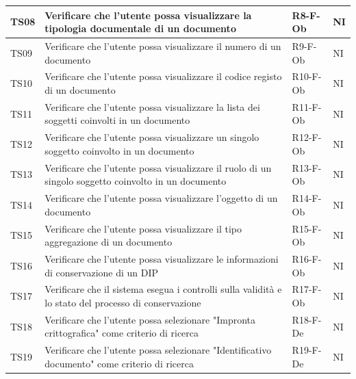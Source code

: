 \documentclass[a4paper,12pt]{article}
\begin{document}
\begin{longtable}{|M{1.2cm}|M{6.3cm}|M{2.5cm}|M{1.5cm}|}
                TS08 & Verificare che l'utente possa visualizzare la tipologia documentale di un documento & R8-F-Ob & NI \\
                \hline

                TS09 & Verificare che l'utente possa visualizzare il numero di un documento & R9-F-Ob & NI \\
                \hline

                TS10 & Verificare che l'utente possa visualizzare il codice registo di un documento & R10-F-Ob & NI \\
                \hline

                TS11 & Verificare che l'utente possa visualizzare la lista dei soggetti coinvolti in un documento & R11-F-Ob & NI \\
                \hline

                TS12 & Verificare che l'utente possa visualizzare un singolo soggetto coinvolto in un documento & R12-F-Ob & NI \\
                \hline

                TS13 & Verificare che l'utente possa visualizzare il ruolo di un singolo soggetto coinvolto in un documento & R13-F-Ob & NI \\
                \hline

                TS14 & Verificare che l'utente possa visualizzare l'oggetto di un documento & R14-F-Ob & NI \\
                \hline

                TS15 & Verificare che l'utente possa visualizzare il tipo aggregazione di un documento & R15-F-Ob & NI \\
                \hline

                TS16 & Verificare che l'utente possa visualizzare le informazioni di conservazione di un DIP & R16-F-Ob & NI \\
                \hline

                TS17 & Verificare che il sistema esegua i controlli sulla validità e lo stato del processo di conservazione & R17-F-Ob & NI \\
                \hline

                TS18 & Verificare che l'utente possa selezionare "Impronta crittografica" come criterio di ricerca & R18-F-De & NI \\
                \hline

                TS19 & Verificare che l'utente possa selezionare "Identificativo documento" come criterio di ricerca & R19-F-De & NI \\
                \hline


\end{longtable}
\end{document}

